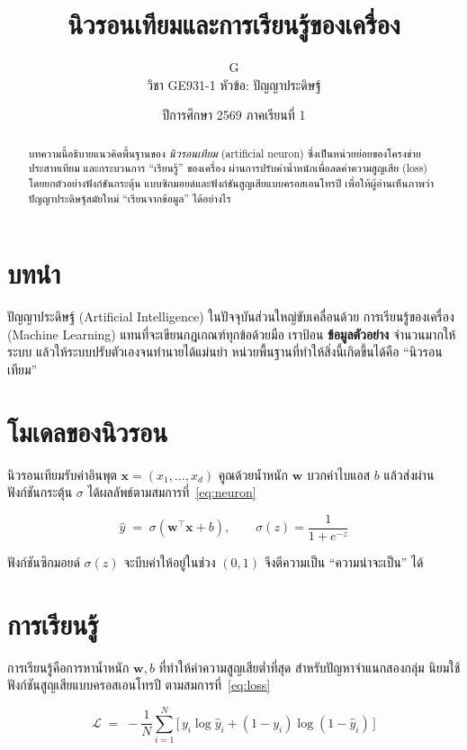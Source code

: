 \documentclass[12pt]{article}
\title{\textbf{นิวรอนเทียมและการเรียนรู้ของเครื่อง}}
\author{G \\ \small วิชา GE931-1 \quad หัวข้อ: ปัญญาประดิษฐ์}
\date{ปีการศึกษา 2569 ภาคเรียนที่ 1}
\begin{document}
\maketitle

\begin{abstract}
บทความนี้อธิบายแนวคิดพื้นฐานของ \textit{นิวรอนเทียม} (artificial neuron)
ซึ่งเป็นหน่วยย่อยของโครงข่ายประสาทเทียม และกระบวนการ ``เรียนรู้'' ของเครื่อง
ผ่านการปรับค่าน้ำหนักเพื่อลดค่าความสูญเสีย (loss) โดยยกตัวอย่างฟังก์ชันกระตุ้น
แบบซิกมอยด์และฟังก์ชันสูญเสียแบบครอสเอนโทรปี เพื่อให้ผู้อ่านเห็นภาพว่า
ปัญญาประดิษฐ์สมัยใหม่ ``เรียนจากข้อมูล'' ได้อย่างไร
\end{abstract}

\section{บทนำ}
ปัญญาประดิษฐ์ (Artificial Intelligence) ในปัจจุบันส่วนใหญ่ขับเคลื่อนด้วย
การเรียนรู้ของเครื่อง (Machine Learning) แทนที่จะเขียนกฎเกณฑ์ทุกข้อด้วยมือ
เราป้อน \textbf{ข้อมูลตัวอย่าง} จำนวนมากให้ระบบ แล้วให้ระบบปรับตัวเองจนทำนายได้แม่นยำ
หน่วยพื้นฐานที่ทำให้สิ่งนี้เกิดขึ้นได้คือ ``นิวรอนเทียม''

\section{โมเดลของนิวรอน}
นิวรอนเทียมรับค่าอินพุต $\mathbf{x}=(x_1,\dots,x_d)$ คูณด้วยน้ำหนัก
$\mathbf{w}$ บวกค่าไบแอส $b$ แล้วส่งผ่านฟังก์ชันกระตุ้น $\sigma$
ได้ผลลัพธ์ตามสมการที่~\eqref{eq:neuron}

\begin{equation}
\hat{y} \;=\; \sigma\!\left(\mathbf{w}^{\top}\mathbf{x}+b\right),
\qquad
\sigma(z)=\frac{1}{1+e^{-z}}
\label{eq:neuron}
\end{equation}

ฟังก์ชันซิกมอยด์ $\sigma(z)$ จะบีบค่าให้อยู่ในช่วง $(0,1)$
จึงตีความเป็น ``ความน่าจะเป็น'' ได้

\section{การเรียนรู้}
การเรียนรู้คือการหาน้ำหนัก $\mathbf{w},b$ ที่ทำให้ค่าความสูญเสียต่ำที่สุด
สำหรับปัญหาจำแนกสองกลุ่ม นิยมใช้ฟังก์ชันสูญเสียแบบครอสเอนโทรปี
ตามสมการที่~\eqref{eq:loss}

\begin{equation}
\mathcal{L} \;=\; -\frac{1}{N}\sum_{i=1}^{N}
\Big[\,y_i\log \hat{y}_i + (1-y_i)\log(1-\hat{y}_i)\,\Big]
\label{eq:loss}
\end{equation}
\end{document}
